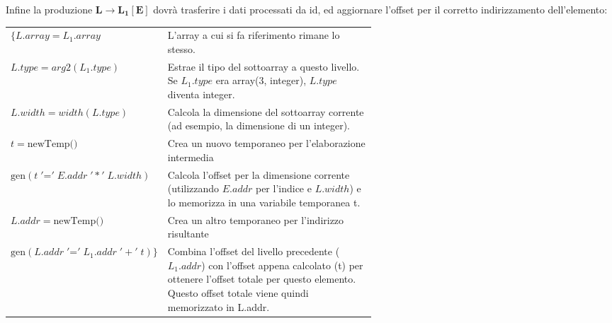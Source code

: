 \documentclass[11pt]{article}
\begin{document}
\newpage
\noindent Infine la produzione $\mathbf{L \rightarrow L_1[E] }$ dovrà trasferire i dati processati da id,
ed aggiornare l'offset per il corretto indirizzamento dell'elemento:
\begin{tcolorbox}[colframe=black!10!black, colback=black!10!white]

\begin{center}
  \begin{tabularx}{\linewidth}{l m{0.6\linewidth}}
  $\{L.array = L_1.array$
      & \small L'array a cui si fa riferimento rimane lo stesso. \\[0.3cm]
  
  $L.type = arg2(L_1.type)$
      & \small Estrae il tipo del sottoarray a questo livello. Se $L_1.type$ era array(3, integer), $L.type$ diventa integer. \\[0.3cm]
  
  $ L.width = width(L.type) $
      & \small Calcola la dimensione del sottoarray corrente (ad esempio, la dimensione di un integer).\\[0.3cm]
  
  $ t = \text{newTemp()} $
      & \small Crea un nuovo temporaneo per l'elaborazione intermedia \\[0.3cm]
  
  $ \text{gen}(t \;'\mathord{=}'\; E.addr \;'*'\; L.width)$
      & \small Calcola l'offset per la dimensione corrente (utilizzando $E.addr$ per l'indice e $L.width$) e lo memorizza in una variabile temporanea t. \\[0.3cm]
  
  $ L.addr = \text{newTemp()} $
      & \small Crea un altro temporaneo per l'indirizzo risultante \\[0.3cm]
  
  $ \text{gen}(L.addr \;'\mathord{=}'\; L_1.addr \;'+'\; t )\}$
      & \small Combina l'offset del livello precedente ($L_1.addr$) con l'offset appena calcolato (t) per ottenere l'offset totale per questo elemento. Questo offset totale viene quindi memorizzato in L.addr. \\
  \end{tabularx}  
\end{center}
\end{tcolorbox}
\end{document}
